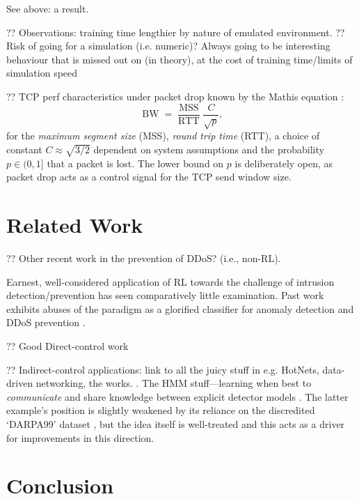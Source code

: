 \documentclass[conference, letterpaper, 10pt, times]{IEEEtran}
\begin{document}
See above: a result.

?? Observations: training time lengthier by nature of emulated environment.
?? Risk of going for a simulation (i.e. numeric)? Always going to be interesting behaviour that is missed out on (in theory), at the cost of training time/limits of simulation speed

?? TCP perf characteristics under packet drop known by the Mathis equation \cite{DBLP:journals/ccr/MathisSMO97}:
$$ \operatorname{BW} = \frac{\operatorname{MSS}}{\operatorname{RTT}} \frac{C}{\sqrt{p}},$$
for the \emph{maximum segment size} (MSS), \emph{round trip time} (RTT), a choice of constant $C \approx{} \sqrt{3/2}$ dependent on system assumptions and the probability $p \in (0, 1]$ that a packet is lost.
The lower bound on $p$ is deliberately open, as packet drop acts as a control signal for the TCP send window size.

\section{Related Work}

?? Other recent work in the prevention of DDoS? (i.e., non-RL).

Earnest, well-considered application of RL towards the challenge of intrusion detection/prevention has seen comparatively little examination.
Past work exhibits abuses of the paradigm as a glorified classifier for anomaly detection \cite{shamshirband2014anomaly} and DDoS prevention \cite{DBLP:conf/mates/ServinK08}.

?? Good Direct-control work \cite{DBLP:phd/ethos/Malialis14, DBLP:journals/eaai/MalialisK15}

?? Indirect-control applications: link to all the juicy stuff in e.g. HotNets, data-driven networking, the works. \cite{DBLP:conf/hotnets/ValadarskySST17, DBLP:conf/hotnets/MaoAMK16}.
The HMM stuff---learning when best to \emph{communicate} and share knowledge between explicit detector models \cite{DBLP:conf/paisi/XuSH07}.
The latter example's position is slightly weakened by its reliance on the discredited `DARPA99' dataset \cite{DARPA-IDD, DBLP:conf/cisda/TavallaeeBLG09, DBLP:conf/sp/SommerP10}, but the idea itself is well-treated and this acts as a driver for improvements in this direction.

\section{Conclusion}
\end{document}
